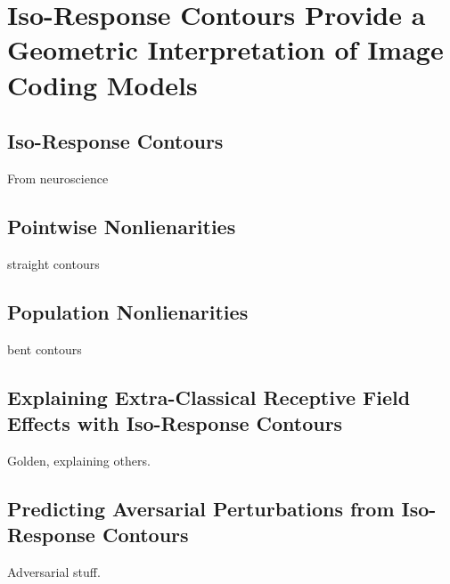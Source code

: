 \chapter{Iso-Response Contours Provide a Geometric Interpretation of Image Coding Models}

\section{Iso-Response Contours}
From neuroscience

\section{Pointwise Nonlienarities}
straight contours

\section{Population Nonlienarities}
bent contours

\section{Explaining Extra-Classical Receptive Field Effects with Iso-Response Contours}
Golden, explaining others.

\section{Predicting Aversarial Perturbations from Iso-Response Contours}
Adversarial stuff.